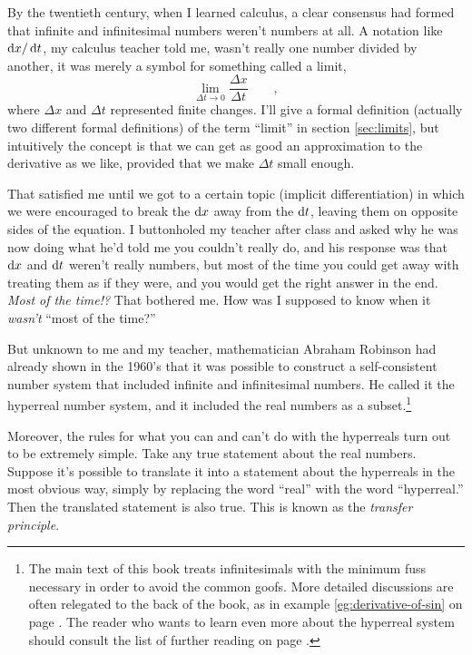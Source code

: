 By the twentieth century, when I learned calculus, a clear consensus had formed that infinite and infinitesimal
numbers weren't numbers at all. A notation like $\operatorname{d\!} x/\operatorname{d\!} t$, my calculus teacher told me, wasn't really
one number divided by another, it was merely a symbol for something called a limit,
\begin{equation*}
\lim_{\Delta t\rightarrow 0} \frac{\Delta x}{\Delta t} \qquad ,
\end{equation*}
where $\Delta x$ and $\Delta t$ represented finite changes. I'll give a formal definition (actually two different formal
definitions) of the term ``limit'' in section \ref{sec:limits}, but intuitively the concept is that we can get as good
an approximation to the derivative as we like, provided that we make $\Delta t$ small enough.

That satisfied me until we got to a certain topic
(implicit differentiation) in which we were encouraged to break the $\operatorname{d\!} x$ away from the $\operatorname{d\!} t$, leaving them on
opposite sides of the equation. I buttonholed my teacher after class and asked why he was now doing what he'd
told me you couldn't really do, and his response was that $\operatorname{d\!} x$ and $\operatorname{d\!} t$ weren't really numbers,
but most of the time you could get away with treating them as if they were, and you would get the right
answer in the end. \emph{Most of the time!?} That bothered me. How was I supposed to know when it \emph{wasn't}
``most of the time?''


But unknown to me and my teacher, mathematician Abraham Robinson
had already shown in the 1960's that it
was possible to construct a self-consistent number system that included infinite and infinitesimal numbers.
He called it the hyperreal number system,
and it included the real numbers as a subset.\footnote{The main text of this book treats infinitesimals
with the minimum fuss necessary in order to avoid the common goofs. More detailed
discussions are often relegated to the back of the book, as in example \ref{eg:derivative-of-sin} on page \pageref{eg:derivative-of-sin}.
The reader who
wants to learn even more about the hyperreal system should consult the list of further reading on page \pageref{ch:further-reading}.
}

Moreover, the
rules for what you can and can't do with the hyperreals turn out to be extremely simple. 
Take any true statement about the real numbers. Suppose it's possible to translate it into a statement about
the hyperreals in the most obvious way, simply by replacing the word ``real'' with the word ``hyperreal.''
Then the translated statement is also true. This is known as the \emph{transfer principle}.


